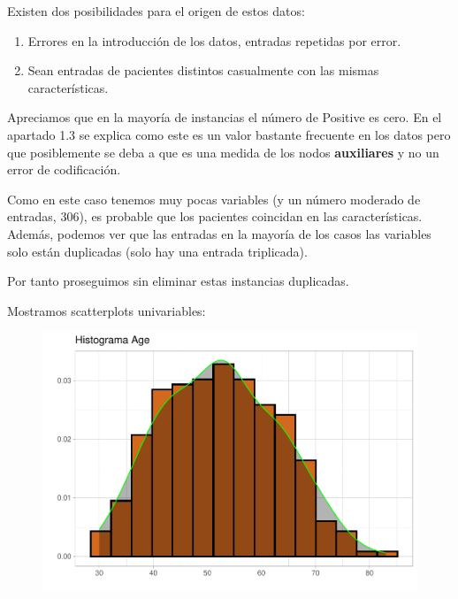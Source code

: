 \vspace{\baselineskip}

Existen dos posibilidades para el origen de estos datos:

\begin{enumerate}
    \def\labelenumi{\arabic{enumi}.}
    \item Errores en la introducción de los datos, entradas repetidas por error.
    \item Sean entradas de pacientes distintos casualmente con las mismas características.
\end{enumerate}

Apreciamos que en la mayoría de instancias el número de Positive es cero. En el apartado 1.3 se explica como este es un valor bastante frecuente en los datos pero que posiblemente se deba a que es una medida de los nodos \textbf{auxiliares} y no un error de codificación.
\vspace{\baselineskip}

Como en este caso tenemos muy pocas variables (y un número moderado de entradas, 306), es probable que los pacientes coincidan en las características. Además, podemos ver que las entradas en la mayoría de los casos las variables solo están duplicadas (solo hay una entrada triplicada).

\vspace{\baselineskip}

Por tanto proseguimos sin eliminar estas instancias duplicadas.

\newpage
Mostramos scatterplots univariables:

\begin{figure}[H]\includegraphics[width=.9\linewidth]{img/EDA2_files/figure-latex/unnamed-chunk-10-1} \end{figure}

